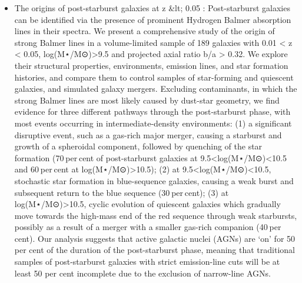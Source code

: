 \documentclass[ceqn,usenatbib,onecolumn]{mnras}
\begin{document}
\begin{itemize}
    \item \citet{2018MNRAS.477.1708P} The origins of post-starburst galaxies at z \&lt; 0.05 : Post-starburst galaxies can be identified via the presence of prominent Hydrogen Balmer absorption lines in their spectra. We present a comprehensive study of the origin of strong Balmer lines in a volume-limited sample of 189 galaxies with 0.01 < z < 0.05, log(M⋆/M⊙)>9.5 and projected axial ratio b/a > 0.32. We explore their structural properties, environments, emission lines, and star formation histories, and compare them to control samples of star-forming and quiescent galaxies, and simulated galaxy mergers. Excluding contaminants, in which the strong Balmer lines are most likely caused by dust-star geometry, we find evidence for three different pathways through the post-starburst phase, with most events occurring in intermediate-density environments: (1) a significant disruptive event, such as a gas-rich major merger, causing a starburst and growth of a spheroidal component, followed by quenching of the star formation (70 per cent of post-starburst galaxies at 9.5<log({M}⋆/{M}⊙)<10.5 and 60 per cent at log({M}⋆/{M}⊙)>10.5⁠); (2) at 9.5<log({M}⋆/{M}⊙)<10.5⁠, stochastic star formation in blue-sequence galaxies, causing a weak burst and subsequent return to the blue sequence (30 per cent); (3) at log({M}⋆/{M}⊙)>10.5⁠, cyclic evolution of quiescent galaxies which gradually move towards the high-mass end of the red sequence through weak starbursts, possibly as a result of a merger with a smaller gas-rich companion (40 per cent). Our analysis suggests that active galactic nuclei (AGNs) are ‘on’ for 50 per cent of the duration of the post-starburst phase, meaning that traditional samples of post-starburst galaxies with strict emission-line cuts will be at least 50 per cent incomplete due to the exclusion of narrow-line AGNs.

\end{itemize}
\end{document}
